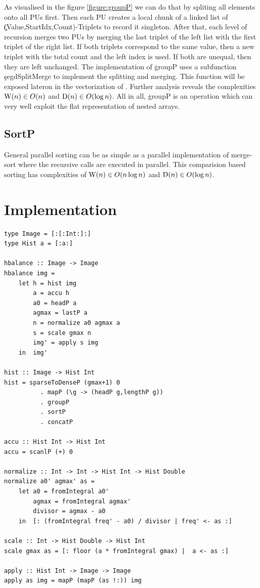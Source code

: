       As visualised in the figure \ref{figure:groupP}
      we can do that by spliting all elements onto all PUs first.
      Then each PU creates a local chunk of a linked list of
      \c{(Value,StartIdx,Count)}-Triplets to record it singleton.
      After that, each level of recursion merges two PUs by
      merging the last triplet of the left list with the first triplet
      of the right list. If both triplets correspond to the same value,
      then a new triplet with the total count and the left index is used.
      If both are unequal, then they are left unchanged. The implementation
      of \c{groupP} uses a subfunction \c{segdSplitMerge} to implement the
      splitting and merging. This function will be exposed lateron in
      the vectorization of \ndpn.
      Further analysis reveals the complexities $\textrm{W}(n) \in O(n)$ and $\textrm{D}(n) \in O(\log n)$.
      All in all, \c{groupP} is an operation which can very well exploit the flat representation of nested arrays.
      
    \subsection{SortP}
      General parallel sorting can be as simple as a parallel
      implementation of merge-sort where the recursive calls are executed
      in parallel. This comparision based sorting has complexities of
      $\textrm{W}(n) \in O(n \log n)$ and $\textrm{D}(n) \in O(\log n)$. 
      
  \section{Implementation}
    \begin{lstlisting}
type Image = [:[:Int:]:]
type Hist a = [:a:]

hbalance :: Image -> Image
hbalance img =
    let h = hist img
        a = accu h
        a0 = headP a
        agmax = lastP a
        n = normalize a0 agmax a
        s = scale gmax n
        img' = apply s img
    in  img'

hist :: Image -> Hist Int
hist = sparseToDenseP (gmax+1) 0
          . mapP (\g -> (headP g,lengthP g))
          . groupP
          . sortP
          . concatP

accu :: Hist Int -> Hist Int
accu = scanlP (+) 0

normalize :: Int -> Int -> Hist Int -> Hist Double
normalize a0' agmax' as =
    let a0 = fromIntegral a0'
        agmax = fromIntegral agmax'
        divisor = agmax - a0
    in  [: (fromIntegral freq' - a0) / divisor | freq' <- as :]

scale :: Int -> Hist Double -> Hist Int
scale gmax as = [: floor (a * fromIntegral gmax) |  a <- as :]

apply :: Hist Int -> Image -> Image
apply as img = mapP (mapP (as !:)) img
    \end{lstlisting}
